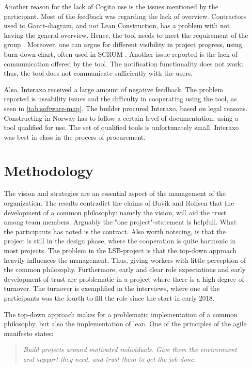 Another reason for the lack of Cogito use is the issues mentioned by the participant. Most of the feedback was regarding the lack of overview. Contractors used to Gantt-diagram, and not Lean Construction, has a problem with not having the general overview. Hence, the tool needs to meet the requirement of the group \cite{subramanyam2010user}. Moreover, one can argue for different visibility in project progress, using burn-down-chart, often used in SCRUM \cite{sutherland}. Another issue reported is the lack of communication offered by the tool. The notification functionality does not work; thus, the tool does not communicate sufficiently with the users. 

Also, Interaxo received a large amount of negative feedback. The problem reported is useability issues and the difficulty in cooperating using the tool, as seen in \ref{tab:software-map}. The builder procured Interaxo, based on legal reasons. Constructing in Norway has to follow a certain level of documentation, using a tool qualified for use. The set of qualified tools is unfortunately small. Interaxo was best in class in the process of procurement. 

\section{Methodology}
The vision and strategies are an essential aspect of the management of the organization. The results contradict the claims of Buvik and Rolfsen \cite{rolfsen} that the development of a common philosophy: namely the vision, will aid the trust among team members. Arguably the "one project"-statement is helpfull. What the participants has noted is the contract. Also worth notecing, is that the project is still in the design phase, where the cooperation is quite harmonic in most projects. The problem in the LSB-project is that the top-down approach heavily influences the management. Thus, giving workers with little perception of the common philosophy. Furthermore, early and clear role expectations and early development of trust are problematic in a project where there is a high degree of turnover. The turnover is exemplified in the interviews, where one of the participants was the fourth to fill the role since the start in early 2018.
     
The top-down approach makes for a problematic implementation of a common philosophy, but also the implementation of lean. One of the principles of the agile manifesto \cite{agile_manifesto} states:
\begin{quote}
    \textit{Build projects around motivated individuals. Give them the environment and support they need, and trust them to get the job done.}
\end{quote}
    
